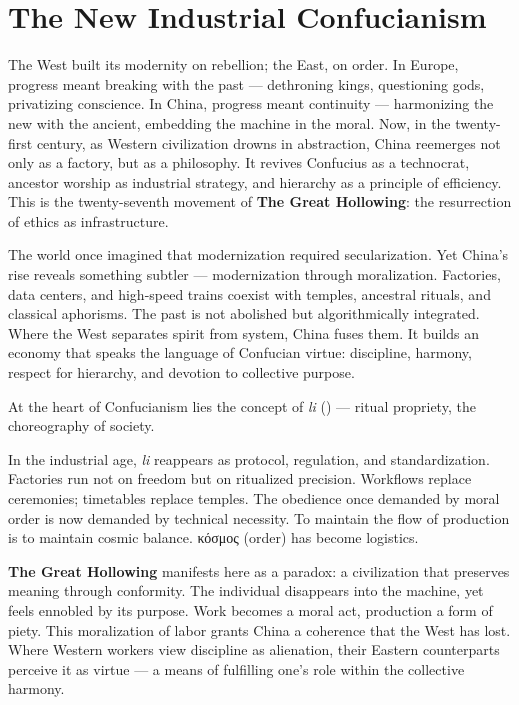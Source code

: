 \documentclass[11pt,twoside]{book}
\begin{document}
% 
\chapter{The New Industrial Confucianism}
\label{ch:29}

The West built its modernity on rebellion; the East, on order.  
In Europe, progress meant breaking with the past — dethroning kings, questioning gods, privatizing conscience.  
In China, progress meant continuity — harmonizing the new with the ancient, embedding the machine in the moral.  
Now, in the twenty-first century, as Western civilization drowns in abstraction, China reemerges not only as a factory, but as a philosophy.  
It revives Confucius as a technocrat, ancestor worship as industrial strategy, and hierarchy as a principle of efficiency.  
This is the twenty-seventh movement of \textbf{The Great Hollowing}: the resurrection of ethics as infrastructure.

The world once imagined that modernization required secularization.  
Yet China’s rise reveals something subtler — modernization through moralization.  
Factories, data centers, and high-speed trains coexist with temples, ancestral rituals, and classical aphorisms.  
The past is not abolished but algorithmically integrated.  
Where the West separates spirit from system, China fuses them.  
It builds an economy that speaks the language of Confucian virtue: discipline, harmony, respect for hierarchy, and devotion to collective purpose.

At the heart of Confucianism lies the concept of \textit{li} () — ritual propriety, the choreography of society.
  
In the industrial age, \textit{li} reappears as protocol, regulation, and standardization.  
Factories run not on freedom but on ritualized precision.  
Workflows replace ceremonies; timetables replace temples.  
The obedience once demanded by moral order is now demanded by technical necessity.  
To maintain the flow of production is to maintain cosmic balance.  
\foreignlanguage{greek}{κόσμος} (order) has become logistics.

\textbf{The Great Hollowing} manifests here as a paradox: a civilization that preserves meaning through conformity.  
The individual disappears into the machine, yet feels ennobled by its purpose.  
Work becomes a moral act, production a form of piety.  
This moralization of labor grants China a coherence that the West has lost.  
Where Western workers view discipline as alienation, their Eastern counterparts perceive it as virtue — a means of fulfilling one’s role within the collective harmony.
\end{document}
